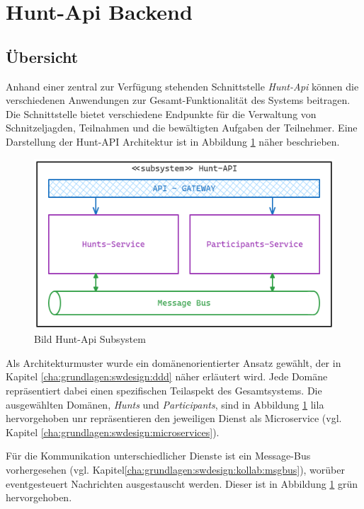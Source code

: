 \section{Hunt-Api Backend} \label{cha:swentwurf:backend}

\subsection{Übersicht}

Anhand einer zentral zur Verfügung stehenden Schnittstelle \textit{Hunt-Api} können die verschiedenen Anwendungen zur Gesamt-Funktionalität des Systems beitragen. Die Schnittstelle bietet verschiedene Endpunkte für die Verwaltung von Schnitzeljagden, Teilnahmen und die bewältigten Aufgaben der Teilnehmer. Eine Darstellung der Hunt-API Architektur ist in Abbildung \ref{fig:swentwurf:huntapi:subsystem} näher beschrieben.

\begin{figure}[H]
    \centering
    \includegraphics[width=\textwidth]{images/PrAr-Software-Entwurf-Hunt-Api-Subsystem.png}
    \caption{Bild Hunt-Api Subsystem}
    \label{fig:swentwurf:huntapi:subsystem}
\end{figure}

Als Architekturmuster wurde ein domänenorientierter Ansatz gewählt, der in Kapitel \ref{cha:grundlagen:swdesign:ddd} näher erläutert wird. Jede Domäne repräsentiert dabei einen spezifischen Teilaspekt des Gesamtsystems. Die ausgewählten Domänen, \textit{Hunts} und \textit{Participants}, sind in Abbildung \ref{fig:swentwurf:huntapi:subsystem} lila hervorgehoben unr repräsentieren den jeweiligen Dienst als Microservice (vgl. Kapitel \ref{cha:grundlagen:swdesign:microservices}).

Für die Kommunikation unterschiedlicher Dienste ist ein Message-Bus vorhergesehen (vgl. Kapitel\ref{cha:grundlagen:swdesign:kollab:msgbus}), worüber eventgesteuert Nachrichten ausgestauscht werden. Dieser ist in Abbildung \ref{fig:swentwurf:huntapi:subsystem} grün hervorgehoben.

